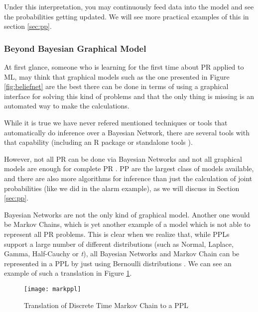 \begin{itemsize}
Under this interpretation, you may continuously feed data into the model and see
the probabilities getting updated. We will see more practical examples of this
in section \ref{sec:pp}.

\subsubsection{Beyond Bayesian Graphical Model}

At first glance, someone who is learning for the first time about PR applied
to ML, may think that graphical models such as the one presented in Figure
\ref{fig:beliefnet} are the best there can be done in terms of using a graphical
interface for solving this kind of problems and that the only thing is missing
is an automated way to make the calculations.

While it is true we have never refered mentioned techniques or tools that
automatically do inference over a Bayesian Network, there are several tools
with that capability (including an R package \cite{Højsgaard2013} or
standalone tools \cite{msbn}).

However, not all PR can be done via Bayesian Networks and not all graphical models
are enough for complete PR \cite{intpp}. PP are the largest class of models available, and there are
also more algorithms for inference than just the calculation of joint
probabilities (like we did in the alarm example), as we will discuss in Section
\ref{sec:pp}.

Bayesian Networks are not the only kind of graphical model. Another one would be
Markov Chains, which is yet another example of a model which is not able to
represent all PR problems. This is clear when we realize that, while PPLs
support a large number of different distributions (such as Normal, Laplace,
Gamma, Half-Cauchy or \textit{t}), all Bayesian Networks and Markov Chain
can be represented in a PPL by just using Bernoulli distributions \cite{PPm}.
We can see an example of such a translation in Figure \ref{fig:mppl}.

\begin{figure}[t]
  \begin{center}
    \leavevmode
    \texttt{[image: markppl]}
    \caption{Translation of Discrete Time Markov Chain to a PPL \cite{PPm}}
    \label{fig:mppl}
  \end{center}
\end{figure}



\end{itemsize}
